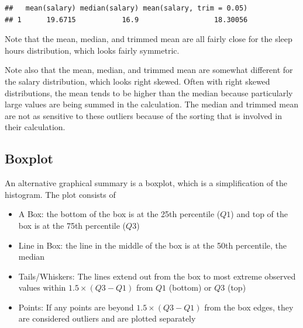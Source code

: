 \documentclass[
]{book}
\newenvironment{Shaded}{\begin{snugshade}}{\end{snugshade}}
\newcommand{\DataTypeTok}[1]{\textcolor[rgb]{0.13,0.29,0.53}{#1}}
\newcommand{\FloatTok}[1]{\textcolor[rgb]{0.00,0.00,0.81}{#1}}
\newcommand{\KeywordTok}[1]{\textcolor[rgb]{0.13,0.29,0.53}{\textbf{#1}}}
\newcommand{\NormalTok}[1]{#1}
\newcommand{\OperatorTok}[1]{\textcolor[rgb]{0.81,0.36,0.00}{\textbf{#1}}}
\newcommand{\StringTok}[1]{\textcolor[rgb]{0.31,0.60,0.02}{#1}}
\providecommand{\tightlist}{%
  \setlength{\itemsep}{0pt}\setlength{\parskip}{0pt}}
\begin{document}
\begin{Shaded}
\end{Shaded}

\begin{verbatim}
##   mean(salary) median(salary) mean(salary, trim = 0.05)
## 1      19.6715           16.9                  18.30056
\end{verbatim}

Note that the mean, median, and trimmed mean are all fairly close for the sleep hours distribution, which looks fairly symmetric.

Note also that the mean, median, and trimmed mean are somewhat different for the salary distribution, which looks right skewed. Often with right skewed distributions, the mean tends to be higher than the median because particularly large values are being summed in the calculation. The median and trimmed mean are not as sensitive to these outliers because of the sorting that is involved in their calculation.

\hypertarget{boxplot}{%
\subsection{Boxplot}\label{boxplot}}

An alternative graphical summary is a boxplot, which is a simplification of the histogram. The plot consists of

\begin{itemize}
\tightlist
\item
  A Box: the bottom of the box is at the 25th percentile (\(Q1\)) and top of the box is at the 75th percentile (\(Q3\))
\item
  Line in Box: the line in the middle of the box is at the 50th percentile, the median
\item
  Tails/Whiskers: The lines extend out from the box to most extreme observed values within \(1.5 \times (Q3-Q1)\) from \(Q1\) (bottom) or \(Q3\) (top)
\item
  Points: If any points are beyond \(1.5 \times (Q3-Q1)\) from the box edges, they are considered outliers and are plotted separately
\end{itemize}
\end{document}
